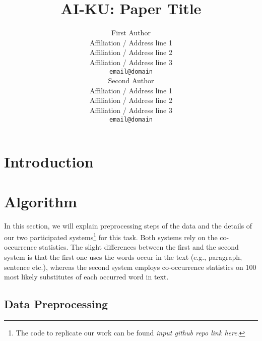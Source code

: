 \documentclass[11pt]{article}
\title{AI-KU: Paper Title}
\author{First Author \\
  Affiliation / Address line 1 \\
  Affiliation / Address line 2 \\
  Affiliation / Address line 3 \\
  {\tt email@domain} \\\And
  Second Author \\
  Affiliation / Address line 1 \\
  Affiliation / Address line 2 \\
  Affiliation / Address line 3 \\
  {\tt email@domain} \\}
\date{}
\begin{document}
\maketitle
\begin{abstract}

\end{abstract}

\section{Introduction}
\label{intro}

\begin{table*}
\caption{Contexts when using a bigram language model}
\label{tab:subs_exp}
\end{table*}

\section{Algorithm}
\label{algorithm}

In this section, we will explain preprocessing steps of the data and the details of our two participated systems\footnote{The code to replicate our work can be found \emph{input github repo link here}.} for this task. Both systems rely on the co-occurrence statistics. The slight differences between the first and the second system is that the first one uses the words occur in the text (e.g., paragraph, sentence etc.), whereas the second system employs co-occurrence statistics on 100 most likely substitutes of each occurred word in text. 

\subsection{Data Preprocessing}
\end{document}
